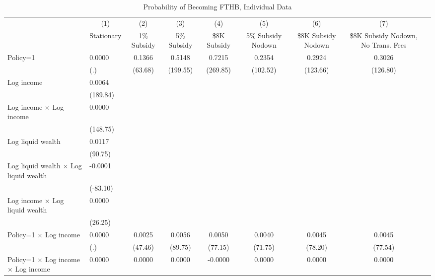 \begin{table}[h!tbp]\centering
\footnotesize
\caption{Probability of Becoming FTHB, Individual Data}
\begin{tabular}{p{1.2in}l*{7}{c}}
\hline\hline
                    &\multicolumn{1}{c}{(1)}&\multicolumn{1}{c}{(2)}&\multicolumn{1}{c}{(3)}&\multicolumn{1}{c}{(4)}&\multicolumn{1}{c}{(5)}&\multicolumn{1}{c}{(6)}&\multicolumn{1}{c}{(7)}\\
                    &\multicolumn{1}{c}{Stationary}&\multicolumn{1}{c}{1\% Subsidy}&\multicolumn{1}{c}{5\% Subsidy}&\multicolumn{1}{c}{\$8K Subsidy}&\multicolumn{1}{p{0.8in}}{5\% Subsidy Nodown}&\multicolumn{1}{p{0.8in}}{\$8K Subsidy Nodown}&\multicolumn{1}{p{0.8in}}{\$8K Subsidy Nodown, No Trans. Fees}\\
\midrule
Policy=1            &      0.0000&      0.1366&      0.5148&      0.7215&      0.2354&      0.2924&      0.3026\\
                    &         (.)&     (63.68)&    (199.55)&    (269.85)&    (102.52)&    (123.66)&    (126.80)\\
[1em]
Log income          &      0.0064&      &    &    &    &    & \\
                    &    (189.84)&    &    &    &    &    & \\
[1em]
Log income $\times$ Log income&      0.0000&      &    &    &    &    & \\
                    &    (148.75)&    &    &    &    &    & \\
[1em]
Log liquid wealth   &      0.0117&      &    &    &    &    & \\
                    &     (90.75)&     &    &    &    &    & \\
[1em]
Log liquid wealth $\times$ Log liquid wealth&     -0.0001&     &    &    &    &    & \\
                    &    (-83.10)&    &    &    &    &    & \\
[1em]
Log income $\times$ Log liquid wealth&      0.0000&      &    &    &    &    & \\
                    &     (26.25)&     &    &    &    &    & \\
[1em]
Policy=1 $\times$ Log income&      0.0000&      0.0025&      0.0056&      0.0050&      0.0040&      0.0045&      0.0045\\
                    &         (.)&     (47.46)&     (89.75)&     (77.15)&     (71.75)&     (78.20)&     (77.54)\\
[1em]
Policy=1 $\times$ Log income $\times$ Log income&      0.0000&      0.0000&      0.0000&     -0.0000&      0.0000&      0.0000&      0.0000\\

\end{tabular}
\end{table}
